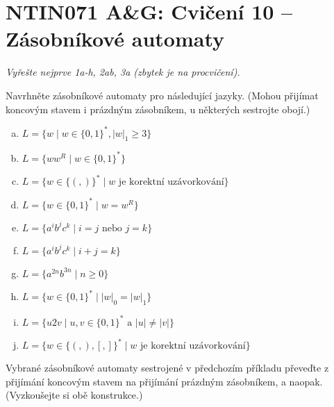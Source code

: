 \documentclass[a4paper,12pt]{amsart}
\begin{document}
\thispagestyle{empty}

\section*{NTIN071 A\&G: Cvičení 10 -- Zásobníkové automaty}


\medskip

\noindent\emph{Vyřešte nejprve 1a-h, 2ab, 3a (zbytek je na procvičení).}

\medskip


\medskip\begin{problem}

    Navrhněte zásobníkové automaty pro následující jazyky. (Mohou přijímat koncovým stavem i prázdným zásobníkem, u některých sestrojte obojí.)

    \medskip

    \begin{enumerate}[(a)]\setlength\itemsep{9pt}
        \item $L=\{w\mid w\in\{0,1\}^*,|w|_1\geq 3\}$
        \item $L=\{ww^R\mid w\in \{0,1\}^*\}$
        \item $L=\{w\in\{(,)\}^*\mid w\text{ je korektní uzávorkování}\}$
        \item $L=\{w\in \{0,1\}^*\mid w=w^R\}$
        \item $L=\{a^ib^jc^k\mid i=j \text{ nebo } j=k\} $
        \item $L=\{a^ib^jc^k\mid i+j=k\}$
        \item $L=\{a^{2n}b^{3n}\mid n\geq 0\}$
        \item $L=\{w\in \{0,1\}^*\mid  |w|_0=|w|_1\} $
        \item $L=\{u2v\mid u,v\in \{0,1\}^*\text{ a }|u|\neq |v|\} $
        \item $L=\{w\in\{(,),[,]\}^*\mid w\text{ je korektní uzávorkování}\}$   
    \end{enumerate}

\end{problem}


\medskip\begin{problem}

    Vybrané zásobníkové automaty sestrojené v předchozím příkladu převeďte z přijímání koncovým stavem na přijímání prázdným zásobníkem, a naopak. (Vyzkoušejte si obě konstrukce.)

\end{problem}
\end{document}
